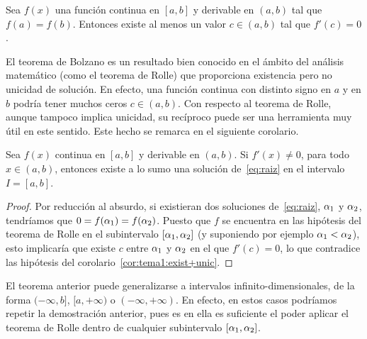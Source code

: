 \begin{theorem}[Rolle]
  \label{thm:bolzano}
  Sea $f(x)$ una función continua en $[a, b]$ y derivable en
  $(a, b)$ tal que $f(a) = f(b)$.
  Entonces existe al menos un valor $c \in (a, b)$ tal que $f'(c) = 0$.
\end{theorem}

El teorema de Bolzano es un resultado bien conocido en el ámbito del
análisis matemático (como el teorema de Rolle) que proporciona
existencia pero no unicidad de solución. En efecto, una función
continua con distinto signo en $a$ y en $b$ podría tener muchos ceros
$c\in (a,b)$. Con respecto al teorema de Rolle, aunque tampoco implica
unicidad, su recíproco puede ser una herramienta muy útil en este
sentido. Este hecho se remarca en el siguiente
corolario.



\begin{corollary}
  \label{cor:tema1:exist+unic}
  Sea $f(x)$ continua en $[a, b]$ y derivable en $(a, b)$. Si
  $f'(x)\ne 0$, para todo $x\in (a, b)$, entonces existe a lo sumo una
  solución de~\eqref{eq:raiz} en el intervalo $I=[a,b]$.
\end{corollary}

\begin{proof}
  Por reducción al absurdo, si existieran dos soluciones
  de~\eqref{eq:raiz}, $\alpha_1$ y $\alpha_2$, tendríamos que
  $0=f(\alpha_1)=f(\alpha_2)$.  Puesto que $f$ se encuentra en las
  hipótesis del teorema de Rolle en el subintervalo
  $[\alpha_1,\alpha_2]$ (y suponiendo por ejemplo $\alpha_1<\alpha_2$), esto
  implicaría que existe $c$ entre $\alpha_1$ y $\alpha_2$ en el que
  $f'(c)=0$, lo que contradice las hipótesis del
  corolario~\ref{cor:tema1:exist+unic}.
\end{proof}

\begin{remark}
  \label{rk:tema1:exist+unic}
  El teorema anterior puede generalizarse a intervalos
  infinito-dimensionales, de la forma $(-\infty,b]$, $[a,+\infty)$ o
  $(-\infty,+\infty)$. En efecto, en estos casos podríamos repetir la
  demostración anterior, pues es en ella es suficiente el poder
  aplicar el teorema de Rolle dentro de cualquier subintervalo
  $[\alpha_1,\alpha_2]$.
\end{remark}

